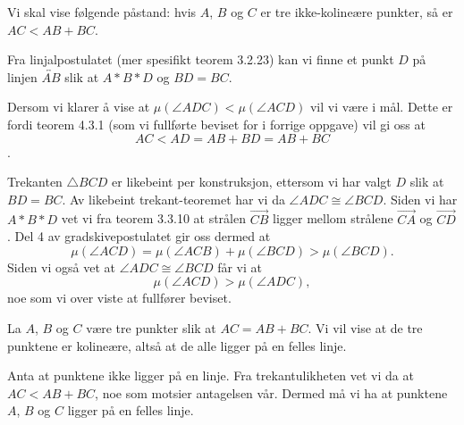 \begin{oppgave}[4.3.2]
    Vi skal vise følgende påstand: hvis $A$, $B$ og $C$ er tre ikke-kolineære punkter, så er $AC<AB+BC$. 

    Fra linjalpostulatet (mer spesifikt teorem 3.2.23) kan vi finne et punkt $D$ på linjen $\overleftrightarrow{AB}$ slik at $A\ast B\ast D$ og $BD=BC$. 

    \begin{figure}[H]
        \centering
        
    \end{figure}

    Dersom vi klarer å vise at $\mu(\angle ADC)<\mu(\angle ACD)$ vil vi være i mål. 
    Dette er fordi teorem 4.3.1 (som vi fullførte beviset for i forrige oppgave) vil gi oss at $$AC<AD=AB+BD = AB+BC$$.
    
    Trekanten $\triangle BCD$ er likebeint per konstruksjon, ettersom vi har valgt $D$ slik at $BD=BC$. 
    Av likebeint trekant-teoremet har vi da $\angle ADC\cong \angle BCD$. 
    Siden vi har $A\ast B\ast D$ vet vi fra teorem 3.3.10 at strålen $\overrightarrow{CB}$ ligger mellom strålene $\overrightarrow{CA}$ og $\overrightarrow{CD}$. 
    Del 4 av gradskivepostulatet gir oss dermed at $$ \mu(\angle ACD)=\mu(\angle ACB)+\mu(\angle BCD)>\mu(\angle BCD).$$
    Siden vi også vet at $\angle ADC\cong \angle BCD$ får vi at 
    $$\mu(\angle ACD)>\mu(\angle ADC),$$
    noe som vi over viste at fullfører beviset. 

\end{oppgave}


\begin{oppgave}[4.3.3]
    La $A$, $B$ og $C$ være tre punkter slik at $AC=AB+BC$. 
    Vi vil vise at de tre punktene er kolineære, altså at de alle ligger på en felles linje. 

    Anta at punktene ikke ligger på en linje. Fra trekantulikheten vet vi da at $AC<AB+BC$, noe som motsier antagelsen vår. 
    Dermed må vi ha at punktene $A$, $B$ og $C$ ligger på en felles linje. 
\end{oppgave}


